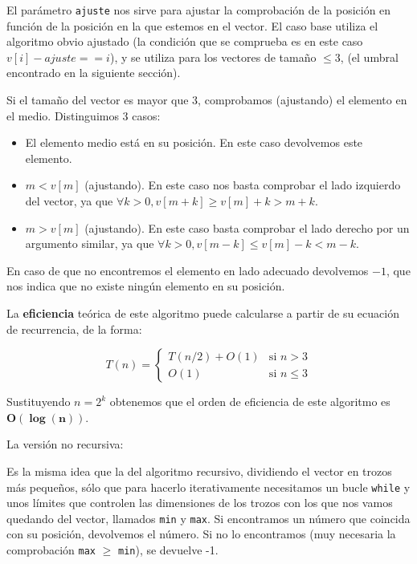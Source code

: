 

El parámetro \texttt{ajuste} nos sirve para ajustar la comprobación de la posición en función de la posición en la que estemos en el vector.
El caso base utiliza el algoritmo obvio ajustado (la condición que se comprueba es en este caso $v[i]-ajuste == i$), y se utiliza para los vectores de tamaño $\leq 3$, (el umbral encontrado en la siguiente sección).

Si el tamaño del vector es mayor que 3, comprobamos (ajustando) el elemento en el medio.
Distinguimos 3 casos:

\begin{itemize}
  \item El elemento medio está en su posición. En este caso devolvemos este elemento.
  \item $m < v[m]$ (ajustando). En este caso nos basta comprobar el lado izquierdo del vector, ya que $\forall k > 0, v[m + k] \geq v[m] + k > m + k$.
  \item $m > v[m]$ (ajustando). En este caso basta comprobar el lado derecho por un argumento similar, ya que $\forall k > 0, v[m - k] \leq v[m] - k < m - k$.
\end{itemize}

En caso de que no encontremos el elemento en lado adecuado devolvemos $-1$, que nos indica que no existe ningún elemento en su posición.

La \textbf{eficiencia} teórica de este algoritmo puede calcularse a partir de su ecuación de recurrencia, de la forma:

\[
T(n) = \begin{cases} T(n/2) + O(1) & \mbox{si } n > 3 \\
O(1) & \mbox{si } n \leq 3 \end{cases}\]

Sustituyendo $n = 2^k$ obtenemos que el orden de eficiencia de este algoritmo es $\mathbf{O(\log(n))}$.

\vspace*{1cm}
\hrulefill
\vspace*{1cm}

La versión no recursiva:




Es la misma idea que la del algoritmo recursivo, dividiendo el vector en trozos más pequeños, sólo que para hacerlo iterativamente necesitamos un bucle \texttt{while} y unos límites que controlen las dimensiones de los trozos con los que nos vamos quedando del vector, llamados \texttt{min} y \texttt{max}.  Si encontramos un número que coincida con su posición, devolvemos el número. Si no lo encontramos (muy necesaria la comprobación \texttt{max} $\geq$ \texttt{min}), se devuelve -1.

